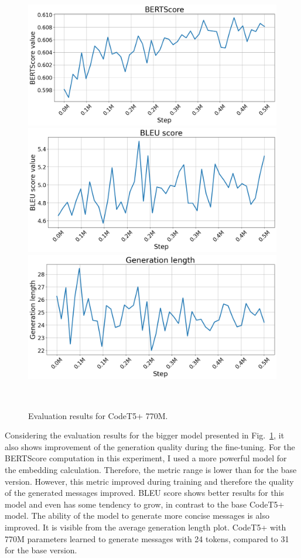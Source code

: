 \begin{figure}[H]
    \centering
    \includegraphics[scale=0.35]{figs/big_BERTScore.png} \\
    \includegraphics[scale=0.35]{figs/big_BLEU score.png} \\
    \includegraphics[scale=0.35]{figs/big_Generation length.png}
    \caption{Evaluation results for CodeT5+ 770M.}
    ~\label{fig:val_metrics_big}
\end{figure}
\newpage
Considering the evaluation results for the bigger model presented in Fig.~\ref{fig:val_metrics_big}, it also shows improvement of the generation quality during the fine-tuning. For the BERTScore computation in this experiment, I used a more powerful model for the embedding calculation. Therefore, the metric range is lower than for the base version. However, this metric improved during training and therefore the quality of the generated messages improved. BLEU score shows better results for this model and even has some tendency to grow, in contrast to the base CodeT5+ model. The ability of the model to generate more concise messages is also improved. It is visible from the average generation length plot. CodeT5+ with 770M parameters learned to generate messages with 24 tokens, compared to 31 for the base version.
